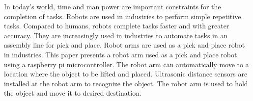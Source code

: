 In today’s world, time and man power are important constraints for the completion of tasks. Robots are used in
industries to perform simple repetitive tasks. Compared to humans, robots complete tasks faster and with greater accuracy.
They are increasingly used in industries to automate tasks in an assembly line for pick and place. Robot arms are used as a
pick and place robot in industries. This paper presents a robot arm used as a pick and place robot using a raspberry pi
microcontroller. The robot arm can automatically move to a location where the object to be lifted and placed. Ultrasonic
distance sensors are installed at the robot arm to recognize the object. The robot arm is used to hold the object and move it to
desired destination.\cite{r5}